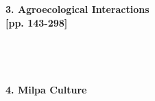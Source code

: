 \documentclass[12pt]{article}
\begin{document}
\textbf{ 3. Agroecological Interactions}\\
 \cite{gliessman_agroecology:_2015} \textbf{[pp. 143-298]}\\
 \cite{gianinazzi_impact_1994}\\
 \cite{schnitzer_soil_2011}\\
 \cite{smith_plant_2009}\\
 \cite {van_der_putten_plantsoil_2013}\\

\textbf{ 4. Milpa Culture}\\
 \cite{jimenez-osornio_agrodiversidad_1999}\\
 \cite{toledo_uso_2008}\\
 \cite{benjamin_carbon_2001}\\
 \cite {dahlin_reconstructing_2005}\\


\clearpage 
\renewcommand{\thepage}{}
\printbibliography
\end{document}
